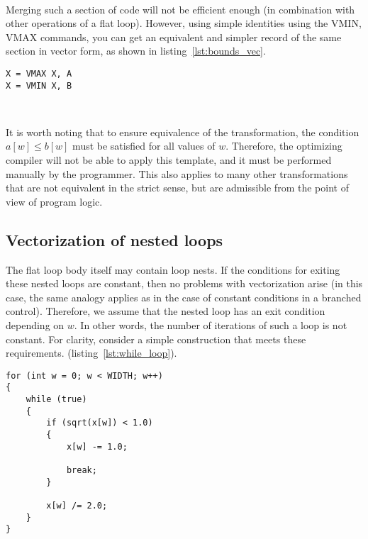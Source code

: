 \documentclass[
11pt,%
tightenlines,%
twoside,%
onecolumn,%
nofloats,%
nobibnotes,%
nofootinbib,%
superscriptaddress,%
noshowpacs,%
centertags]%
{revtex4}
\begin{document}
\

Merging such a section of code will not be efficient enough (in  combination with other operations of a flat loop).
However, using simple identities using the VMIN, VMAX commands, you can get an equivalent and simpler record of the same section in vector form, as shown in listing~\ref{lst:bounds_vec}.

\begin{lstlisting}[caption={Vectorized form of limiting a value using the lower and upper bounds.},label={lst:bounds_vec}]
X = VMAX X, A
X = VMIN X, B
\end{lstlisting}

\

It is worth noting that to ensure equivalence of the transformation, the condition $a[w] \le b[w]$ must be satisfied for all values of $w$.
Therefore, the optimizing compiler will not be able to apply this template, and it must be performed manually by the programmer.
This also applies to many other transformations that are not equivalent in the strict sense, but are admissible from the point of view of program logic.

\subsection{Vectorization of nested loops}

The flat loop body itself may contain loop nests.
If the conditions for exiting these nested loops are constant, then no problems with vectorization arise (in this case, the same analogy applies as in the case of constant conditions in a branched control).
Therefore, we assume that the nested loop has an exit condition depending on $w$.
In other words, the number of iterations of such a loop is not constant.
For clarity, consider a simple construction that meets these requirements. (listing~\ref{lst:while_loop}).

\begin{lstlisting}[caption={Flat loop containing a loop with a non-constant number of iterations},label={lst:while_loop}]
for (int w = 0; w < WIDTH; w++)
{
    while (true)
    {
        if (sqrt(x[w]) < 1.0)
        {
            x[w] -= 1.0;

            break;
        }
            
        x[w] /= 2.0;
    }
}
\end{lstlisting}

\
\end{document}
